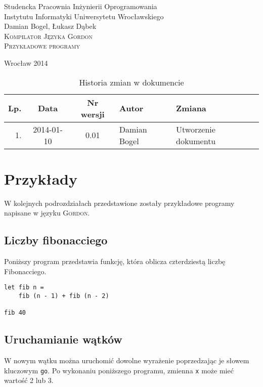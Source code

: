 \documentclass{documentation}
\begin{document}
\begin{titlepage}
\begin{center}
Studencka Pracownia Inżynierii Oprogramowania\\
Instytutu Informatyki Uniwersytetu Wrocławskiego\\[6cm]

Damian Bogel, Łukasz Dąbek\\[1cm]
\textsc{\LARGE Kompilator Języka Gordon}\\[0.5cm]
\textsc{\large Przykładowe programy}

\vfill
Wrocław 2014 \\[2.5cm]

\end{center}
\end{titlepage}

\newpage
\begin{table}
	\centering
    \captionsetup{name=Tabela}
	\caption{Historia zmian w dokumencie}
		\begin{tabular}{|r|c|c|l|l|}
		\hline
		Lp.  & Data       & Nr wersji & Autor                 & Zmiana \\ \hline
		1.   & 2014-01-10 & 0.01 & Damian Bogel & Utworzenie dokumentu \\ \hline
	\end{tabular}
\end{table}
\newpage

\tableofcontents
\setcounter{page}{2}

\newpage

\section{Przykłady}
\noindent W kolejnych podrozdziałach przedstawione zostały przykładowe programy
napisane w języku \textsc{Gordon}.

\subsection{Liczby fibonacciego}
\noindent Poniższy program przedstawia funkcję, która oblicza czterdziestą
liczbę Fibonacciego.

\begin{verbatim}
let fib n = 
    fib (n - 1) + fib (n - 2)

fib 40
\end{verbatim}

\subsection{Uruchamianie wątków}
\noindent W nowym wątku można uruchomić dowolne wyrażenie poprzedzając je słowem kluczowym
\texttt{go}. Po wykonaniu poniższego programu, zmienna \texttt{x} może mieć wartość 2 lub 3.
\end{document}
